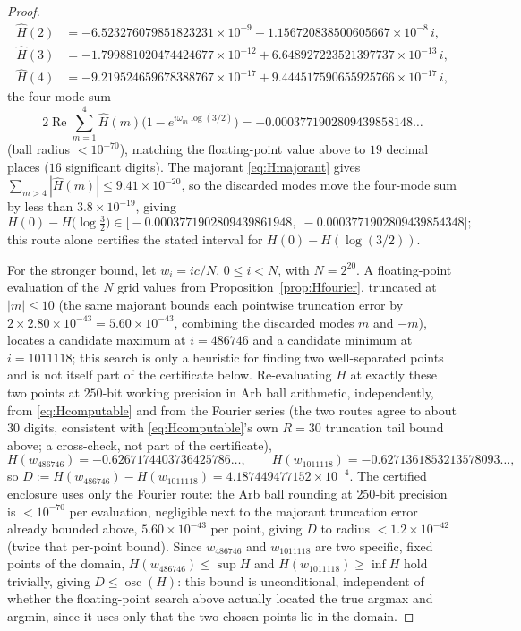 \documentclass[11pt]{amsart}
\theoremstyle{plain}
\theoremstyle{definition}
\theoremstyle{remark}
\begin{document}
\begin{proof}
\begin{align*}
\hat H(2) &= -6.523276079851823231\times10^{-9} + 1.156720838500605667\times10^{-8}\,i,\\
\hat H(3) &= -1.799881020474424677\times10^{-12} + 6.648927223521397737\times10^{-13}\,i,\\
\hat H(4) &= -9.219524659678388767\times10^{-17} + 9.444517590655925766\times10^{-17}\,i,
\end{align*}
the four-mode sum
\[
2\operatorname{Re}\sum_{m=1}^4\hat H(m)\bigl(1-e^{i\omega_m\log(3/2)}\bigr)
= -0.0003771902809439858148\ldots
\]
(ball radius $<10^{-70}$), matching the floating-point value above to $19$ decimal places ($16$
significant digits). The majorant
\eqref{eq:Hmajorant} gives
$\sum_{m>4}|\hat H(m)| \le 9.41\times10^{-20}$, so the discarded modes move the four-mode sum by
less than $3.8\times10^{-19}$, giving
\[
H(0)-H\bigl(\log\tfrac32\bigr) \in \bigl[-0.0003771902809439861948,\; -0.0003771902809439854348\bigr];
\]
this route alone certifies the stated interval for $H(0)-H(\log(3/2))$.

For the stronger bound, let $w_i = ic/N$, $0\le i<N$, with $N = 2^{20}$. A floating-point evaluation
of the $N$ grid values from Proposition~\ref{prop:Hfourier}, truncated at $|m|\le10$ (the same
majorant bounds each pointwise truncation error by $2\times2.80\times10^{-43}=5.60\times10^{-43}$,
combining the discarded modes $m$ and $-m$), locates a candidate maximum at
$i=486746$ and a candidate minimum at $i=1011118$; this search is only a heuristic for finding
two well-separated points and is not itself part of the certificate below. Re-evaluating $H$ at
exactly these two points at $250$-bit working precision in Arb ball arithmetic, independently, from
\eqref{eq:Hcomputable} and from the Fourier series (the two routes agree to about $30$ digits,
consistent with \eqref{eq:Hcomputable}'s own $R=30$ truncation tail bound above; a cross-check, not
part of the certificate),
\[
H(w_{486746}) = -0.6267174403736425786\ldots, \qquad H(w_{1011118}) = -0.6271361853213578093\ldots,
\]
so $D := H(w_{486746})-H(w_{1011118}) = 4.187449477152\times10^{-4}$. The certified enclosure uses
only the Fourier route: the Arb ball rounding at $250$-bit precision is $<10^{-70}$ per evaluation,
negligible next to the majorant truncation error already bounded above, $5.60\times10^{-43}$ per
point, giving $D$ to radius $<1.2\times10^{-42}$ (twice that per-point bound). Since $w_{486746}$ and
$w_{1011118}$ are two specific, fixed points of the domain, $H(w_{486746})\le\sup H$ and
$H(w_{1011118})\ge\inf H$ hold trivially, giving $D\le\operatorname{osc}(H)$: this bound is
unconditional, independent of whether the floating-point search above actually located the true
argmax and argmin, since it uses only that the two chosen points lie in the domain.


\end{proof}
\end{document}
